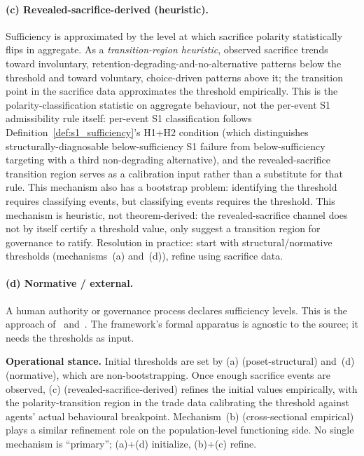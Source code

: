 \paragraph{(c) Revealed-sacrifice-derived (heuristic).}
Sufficiency is approximated by the level at which sacrifice
polarity statistically flips in aggregate.  As a
\emph{transition-region heuristic}, observed sacrifice trends
toward involuntary, retention-degrading-and-no-alternative
patterns below the threshold and toward
voluntary, choice-driven patterns above it; the transition
point in the sacrifice data approximates the threshold
empirically.  This is the polarity-classification statistic
on aggregate behaviour, not the per-event S1 admissibility
rule itself: per-event S1 classification follows
Definition~\ref{def:s1_sufficiency}'s H1+H2 condition (which
distinguishes structurally-diagnosable below-sufficiency
S1 failure from below-sufficiency targeting with a third
non-degrading alternative), and the
revealed-sacrifice transition region serves as a calibration
input rather than a substitute for that rule.  This mechanism
also has a bootstrap problem: identifying the threshold
requires classifying events, but classifying events requires
the threshold.  This
mechanism is heuristic, not theorem-derived: the
revealed-sacrifice channel does not by itself certify a
threshold value, only suggest a transition region for governance
to ratify.  Resolution in practice: start with
structural/normative thresholds (mechanisms~(a) and~(d)),
refine using sacrifice data.

\paragraph{(d) Normative / external.}
A human authority or governance process declares sufficiency
levels.  This is the approach of~\citet{sen1999development}
and~\citet{nussbaum2011creating}.  The framework's formal
apparatus is agnostic to the source; it needs the thresholds as
input.

\medskip\noindent
\textbf{Operational stance.}  Initial thresholds are set by
(a) (poset-structural) and~(d) (normative), which are
non-bootstrapping.  Once enough sacrifice events are observed,
(c) (revealed-sacrifice-derived) refines the initial values
empirically, with the polarity-transition region in the trade
data calibrating the threshold against agents' actual
behavioural breakpoint.  Mechanism~(b) (cross-sectional
empirical) plays a similar refinement role on the
population-level functioning side.  No single mechanism is
``primary''; (a)+(d) initialize, (b)+(c) refine.

